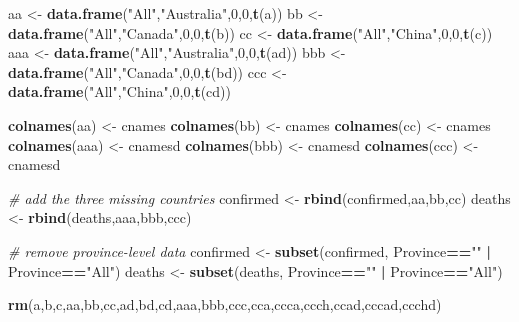 \documentclass[
]{article}
\newenvironment{Shaded}{\begin{snugshade}}{\end{snugshade}}
\newcommand{\CommentTok}[1]{\textcolor[rgb]{0.56,0.35,0.01}{\textit{#1}}}
\newcommand{\DecValTok}[1]{\textcolor[rgb]{0.00,0.00,0.81}{#1}}
\newcommand{\KeywordTok}[1]{\textcolor[rgb]{0.13,0.29,0.53}{\textbf{#1}}}
\newcommand{\NormalTok}[1]{#1}
\newcommand{\OperatorTok}[1]{\textcolor[rgb]{0.81,0.36,0.00}{\textbf{#1}}}
\newcommand{\StringTok}[1]{\textcolor[rgb]{0.31,0.60,0.02}{#1}}
\begin{document}
\begin{Shaded}
\begin{Highlighting}[]
\NormalTok{aa <-}\StringTok{ }\KeywordTok{data.frame}\NormalTok{(}\StringTok{"All"}\NormalTok{,}\StringTok{"Australia"}\NormalTok{,}\DecValTok{0}\NormalTok{,}\DecValTok{0}\NormalTok{,}\KeywordTok{t}\NormalTok{(a))}
\NormalTok{bb <-}\StringTok{ }\KeywordTok{data.frame}\NormalTok{(}\StringTok{"All"}\NormalTok{,}\StringTok{"Canada"}\NormalTok{,}\DecValTok{0}\NormalTok{,}\DecValTok{0}\NormalTok{,}\KeywordTok{t}\NormalTok{(b)) }
\NormalTok{cc <-}\StringTok{ }\KeywordTok{data.frame}\NormalTok{(}\StringTok{"All"}\NormalTok{,}\StringTok{"China"}\NormalTok{,}\DecValTok{0}\NormalTok{,}\DecValTok{0}\NormalTok{,}\KeywordTok{t}\NormalTok{(c))}
\NormalTok{aaa <-}\StringTok{ }\KeywordTok{data.frame}\NormalTok{(}\StringTok{"All"}\NormalTok{,}\StringTok{"Australia"}\NormalTok{,}\DecValTok{0}\NormalTok{,}\DecValTok{0}\NormalTok{,}\KeywordTok{t}\NormalTok{(ad))}
\NormalTok{bbb <-}\StringTok{ }\KeywordTok{data.frame}\NormalTok{(}\StringTok{"All"}\NormalTok{,}\StringTok{"Canada"}\NormalTok{,}\DecValTok{0}\NormalTok{,}\DecValTok{0}\NormalTok{,}\KeywordTok{t}\NormalTok{(bd)) }
\NormalTok{ccc <-}\StringTok{ }\KeywordTok{data.frame}\NormalTok{(}\StringTok{"All"}\NormalTok{,}\StringTok{"China"}\NormalTok{,}\DecValTok{0}\NormalTok{,}\DecValTok{0}\NormalTok{,}\KeywordTok{t}\NormalTok{(cd))}

\KeywordTok{colnames}\NormalTok{(aa) <-}\StringTok{ }\NormalTok{cnames}
\KeywordTok{colnames}\NormalTok{(bb) <-}\StringTok{ }\NormalTok{cnames}
\KeywordTok{colnames}\NormalTok{(cc) <-}\StringTok{ }\NormalTok{cnames}
\KeywordTok{colnames}\NormalTok{(aaa) <-}\StringTok{ }\NormalTok{cnamesd}
\KeywordTok{colnames}\NormalTok{(bbb) <-}\StringTok{ }\NormalTok{cnamesd}
\KeywordTok{colnames}\NormalTok{(ccc) <-}\StringTok{ }\NormalTok{cnamesd}

\CommentTok{# add the three missing countries}
\NormalTok{confirmed <-}\StringTok{ }\KeywordTok{rbind}\NormalTok{(confirmed,aa,bb,cc)}
\NormalTok{deaths <-}\StringTok{ }\KeywordTok{rbind}\NormalTok{(deaths,aaa,bbb,ccc)}

\CommentTok{# remove province-level data}
\NormalTok{confirmed <-}\StringTok{ }\KeywordTok{subset}\NormalTok{(confirmed, Province}\OperatorTok{==}\StringTok{""} \OperatorTok{|}\StringTok{ }\NormalTok{Province}\OperatorTok{==}\StringTok{"All"}\NormalTok{)}
\NormalTok{deaths <-}\StringTok{ }\KeywordTok{subset}\NormalTok{(deaths, Province}\OperatorTok{==}\StringTok{""} \OperatorTok{|}\StringTok{ }\NormalTok{Province}\OperatorTok{==}\StringTok{"All"}\NormalTok{)}

\KeywordTok{rm}\NormalTok{(a,b,c,aa,bb,cc,ad,bd,cd,aaa,bbb,ccc,cca,ccca,ccch,ccad,cccad,ccchd)}


\end{Highlighting}
\end{Shaded}
\end{document}
